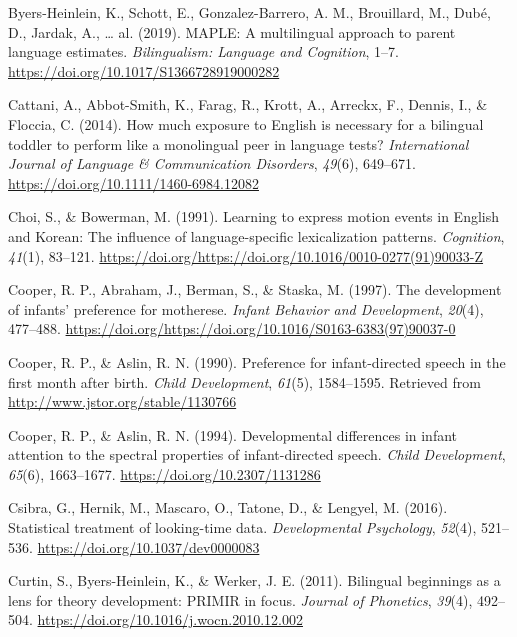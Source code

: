 \documentclass[
  english,
  ,man,floatsintext]{apa6}
\begin{document}
\leavevmode\hypertarget{ref-byers_heinlein_2019}{}%
Byers-Heinlein, K., Schott, E., Gonzalez-Barrero, A. M., Brouillard, M., Dubé, D., Jardak, A., \ldots{} al. (2019). MAPLE: A multilingual approach to parent language estimates. \emph{Bilingualism: Language and Cognition}, 1--7. \url{https://doi.org/10.1017/S1366728919000282}

\leavevmode\hypertarget{ref-cattani_2014}{}%
Cattani, A., Abbot-Smith, K., Farag, R., Krott, A., Arreckx, F., Dennis, I., \& Floccia, C. (2014). How much exposure to English is necessary for a bilingual toddler to perform like a monolingual peer in language tests? \emph{International Journal of Language \& Communication Disorders}, \emph{49}(6), 649--671. \url{https://doi.org/10.1111/1460-6984.12082}

\leavevmode\hypertarget{ref-choi_1991}{}%
Choi, S., \& Bowerman, M. (1991). Learning to express motion events in English and Korean: The influence of language-specific lexicalization patterns. \emph{Cognition}, \emph{41}(1), 83--121. \url{https://doi.org/https://doi.org/10.1016/0010-0277(91)90033-Z}

\leavevmode\hypertarget{ref-cooper_1997}{}%
Cooper, R. P., Abraham, J., Berman, S., \& Staska, M. (1997). The development of infants' preference for motherese. \emph{Infant Behavior and Development}, \emph{20}(4), 477--488. \url{https://doi.org/https://doi.org/10.1016/S0163-6383(97)90037-0}

\leavevmode\hypertarget{ref-cooper_1990}{}%
Cooper, R. P., \& Aslin, R. N. (1990). Preference for infant-directed speech in the first month after birth. \emph{Child Development}, \emph{61}(5), 1584--1595. Retrieved from \url{http://www.jstor.org/stable/1130766}

\leavevmode\hypertarget{ref-cooper_1994}{}%
Cooper, R. P., \& Aslin, R. N. (1994). Developmental differences in infant attention to the spectral properties of infant-directed speech. \emph{Child Development}, \emph{65}(6), 1663--1677. \url{https://doi.org/10.2307/1131286}

\leavevmode\hypertarget{ref-csibra_2016}{}%
Csibra, G., Hernik, M., Mascaro, O., Tatone, D., \& Lengyel, M. (2016). Statistical treatment of looking-time data. \emph{Developmental Psychology}, \emph{52}(4), 521--536. \url{https://doi.org/10.1037/dev0000083}

\leavevmode\hypertarget{ref-curtin_2011}{}%
Curtin, S., Byers-Heinlein, K., \& Werker, J. E. (2011). Bilingual beginnings as a lens for theory development: PRIMIR in focus. \emph{Journal of Phonetics}, \emph{39}(4), 492--504. \url{https://doi.org/10.1016/j.wocn.2010.12.002}
\end{document}
